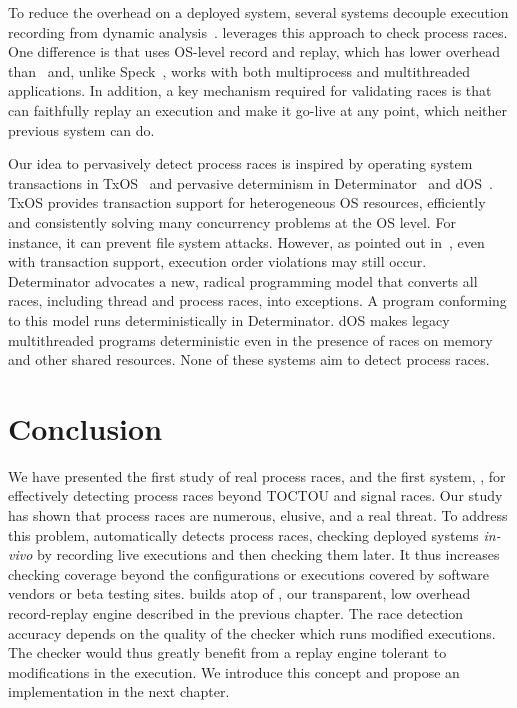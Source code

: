 To reduce the overhead on a deployed system, several systems decouple
execution recording from dynamic
analysis~\cite{decouple:usenix08,speck:asplos08}.  \racepro leverages this
approach to check process races.  One difference is that \racepro uses
OS-level record and replay, which has lower overhead
than~\cite{decouple:usenix08} and, unlike Speck~\cite{speck:asplos08},
\racepro works with both multiprocess and multithreaded applications. In addition, 
a key mechanism required for validating races is that \racepro can faithfully
replay an execution and make it go-live at any point, 
which neither previous system can do.

  Our idea to
pervasively detect process races is inspired by operating system
transactions in TxOS~\cite{txos:sosp09} and pervasive determinism in
Determinator~\cite{determinator:osdi10} and dOS~\cite{dos:osdi10}.  TxOS
provides transaction support for heterogeneous OS resources, efficiently
and consistently solving many concurrency problems at the OS level.  For
instance, it can prevent file system \toctou attacks.  However, as pointed
out in~\cite{lu:concurrency-bugs}, even with transaction support,
execution order violations may still occur.  Determinator advocates a
new, radical programming model that converts all races, including thread
and process races, into exceptions.  A program conforming to this model
runs deterministically in Determinator.  dOS makes legacy multithreaded
programs deterministic even in the presence of races on memory and other
shared resources.  None of these systems aim to detect process races.

\section{Conclusion} \label{racepro:sec:conclusion}

We have presented the first study of real process races, and the first
system, \racepro, for effectively detecting process races beyond TOCTOU
and signal races.   Our study has shown that process races are
numerous, elusive, and a real threat.  To address this problem, \racepro
automatically detects process races, checking deployed
systems \emph{in-vivo} by recording live executions and then checking
them later.  It thus increases checking coverage beyond the
configurations or executions covered by software vendors or beta
testing sites. \racepro builds atop of \scribe, our transparent, low overhead
record-replay engine described in the previous chapter.
The race detection accuracy depends on the quality of the checker which runs
modified executions. The checker would thus greatly benefit from a replay engine
tolerant to modifications in the execution. We introduce this concept and
propose an implementation in the next chapter.
